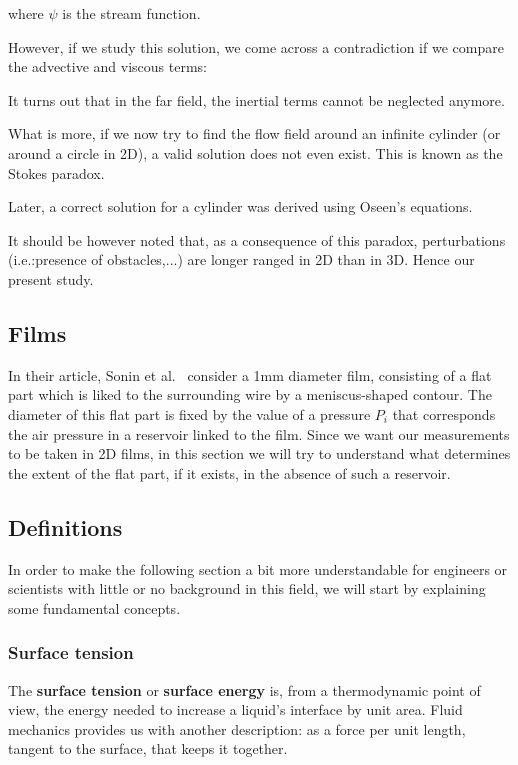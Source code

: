 where $\psi$ is the stream function.

However, if we study this solution, we come across a contradiction if we compare the advective and viscous terms:


It turns out that in the far field, the inertial terms cannot be neglected anymore.

What is more, if we now try to find the flow field around an infinite cylinder (or around a circle in 2D), a valid solution does not even exist. This is known as the Stokes paradox.

Later, a correct solution for a cylinder was derived using Oseen's equations. 

It should be however noted that, as a consequence of this paradox, perturbations (i.e.:presence of obstacles,...) are longer ranged in 2D than in 3D. Hence our present study. 

\subsection{Films}

In their article, Sonin et al.~\cite{SONIN1994} consider a 1mm diameter film, consisting of a flat part which is liked to the surrounding wire by a meniscus-shaped contour. The diameter of this flat part is fixed by the value of a pressure $P_i$ that corresponds the air pressure in a reservoir linked to the film. Since we want our measurements to be taken in 2D films, in this section we will try to understand what determines the extent of the flat part, if it exists, in the absence of such a reservoir.

\subsection{Definitions}

In order to make the following section a bit more understandable for engineers or scientists with little or no background in this field, we will start by explaining some fundamental concepts.

\subsubsection{Surface tension}

The \textbf{surface tension} or \textbf{surface energy} is, from a thermodynamic point of view, the energy needed to increase a liquid's interface by unit area. Fluid mechanics provides us with another description: as a force per unit length, tangent to the surface, that keeps it together.

